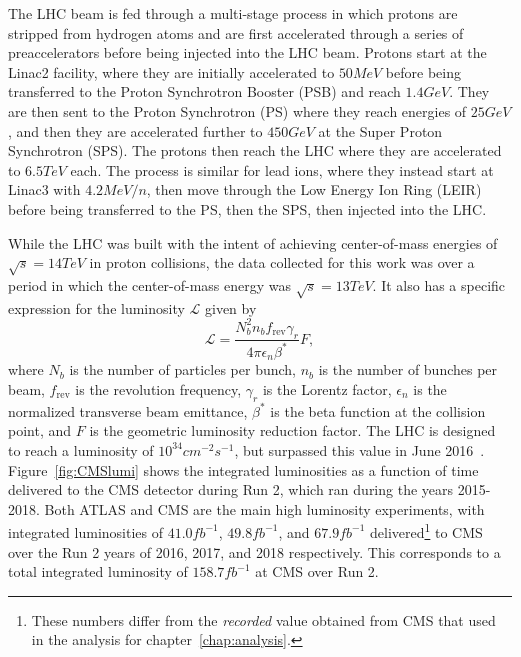The LHC beam is fed through a multi-stage process in which protons are stripped from hydrogen atoms and are first accelerated through a series of preaccelerators before being injected into the LHC beam.
Protons start at the Linac2 facility, where they are initially accelerated to $50\unit{MeV}$ before being transferred to the Proton Synchrotron Booster (PSB) and reach $1.4\unit{GeV}$.
They are then sent to the Proton Synchrotron (PS) where they reach energies of $25\unit{GeV}$, and then they are accelerated further to $450\unit{GeV}$ at the Super Proton Synchrotron (SPS).
The protons then reach the LHC where they are accelerated to $6.5\unit{TeV}$ each.
The process is similar for lead ions, where they instead start at Linac3 with $4.2\unit{MeV/n}$, then move through the Low Energy Ion Ring (LEIR) before being transferred to the PS, then the SPS, then injected into the LHC.

While the LHC was built with the intent of achieving center-of-mass energies of $\sqrt{s}=14\unit{TeV}$ in proton collisions, the data collected for this work was over a period in which the center-of-mass energy was $\sqrt{s}=13\unit{TeV}$.
It also has a specific expression for the luminosity $\mathcal{L}$ given by
\begin{equation}
  \mathcal{L}=\frac{N_b^2n_bf_\mathrm{rev}\gamma_r}{4\pi\epsilon_n\beta^*}F,
\end{equation}
where $N_b$ is the number of particles per bunch, $n_b$ is the number of bunches per beam, $f_\mathrm{rev}$ is the revolution frequency, $\gamma_r$ is the Lorentz factor, $\epsilon_n$ is the normalized transverse beam emittance, $\beta^*$ is the beta function at the collision point, and $F$ is the geometric luminosity reduction factor.
The LHC is designed to reach a luminosity of $10^{34}\unit{cm^{-2}s^{-1}}$, but surpassed this value in June 2016~\cite{LHClumi}.
Figure~\ref{fig:CMSlumi} shows the integrated luminosities as a function of time delivered to the CMS detector during Run 2, which ran during the years 2015-2018.
Both ATLAS and CMS are the main high luminosity experiments, with integrated luminosities of $41.0\unit{fb^{-1}}$, $49.8\unit{fb^{-1}}$, and $67.9\unit{fb^{-1}}$ delivered\footnote{These numbers differ from the \emph{recorded} value obtained from CMS that used in the analysis for chapter~\ref{chap:analysis}.} to CMS over the Run 2 years of 2016, 2017, and 2018 respectively.
This corresponds to a total integrated luminosity of $158.7\unit{fb^{-1}}$ at CMS over Run 2.

